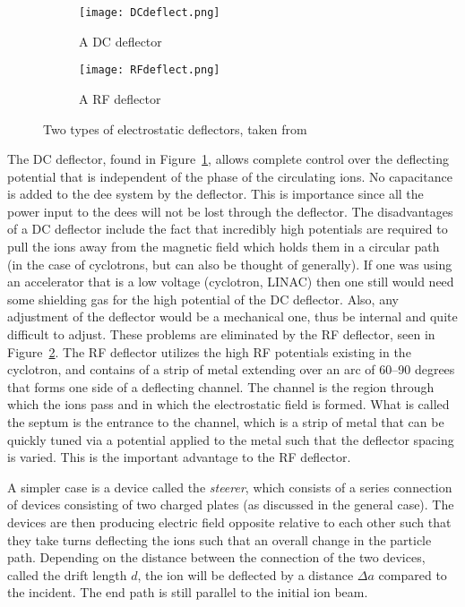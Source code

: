 \begin{figure}
\begin{subfigure}{0.5\textwidth}
\texttt{[image: DCdeflect.png]}
\caption{A DC deflector}
\label{fig:DCdeflector}
\end{subfigure}
\begin{subfigure}{0.5\textwidth}
\texttt{[image: RFdeflect.png]}
\caption{A RF deflector}
\label{fig:RFdeflector}
\end{subfigure}
\caption{Two types of electrostatic deflectors, taken from~\cite{1}}
\label{fig:deflectors}
\end{figure}
The DC deflector, found in Figure~\ref{fig:DCdeflector}, allows complete control over the deflecting potential that is independent of the phase of the circulating ions.
No capacitance is added to the dee system by the deflector.
This is importance since all the power input to the dees will not be lost through the deflector.
The disadvantages of a DC deflector include the fact that incredibly high potentials are required to pull the ions away from the magnetic field which holds them in a circular path (in the case of cyclotrons, but can also be thought of generally).
If one was using an accelerator that is a low voltage (cyclotron, LINAC) then one still would need some shielding gas for the high potential of the DC deflector.
Also, any adjustment of the deflector would be a mechanical one, thus be internal and quite difficult to adjust.
These problems are eliminated by the RF deflector, seen in Figure~\ref{fig:RFdeflector}.
The RF deflector utilizes the high RF potentials existing in the cyclotron, and contains of a strip of metal extending over an arc of 60--90 degrees that forms one side of a deflecting channel.
The channel is the region through which the ions pass and in which the electrostatic field is formed.
What is called the septum is the entrance to the channel, which is a strip of metal that can be quickly tuned via a potential applied to the metal such that the deflector spacing is varied.
This is the important advantage to the RF deflector.

A simpler case is a device called the \textit{steerer}, which consists of a series connection of devices consisting of two charged plates (as discussed in the general case).
The devices are then producing electric field opposite relative to each other such that they take turns deflecting the ions such that an overall change in the particle path.
Depending on the distance between the connection of the two devices, called the drift length $d$, the ion will be deflected by a distance $\Delta a$ compared to the incident.
The end path is still parallel to the initial ion beam.
